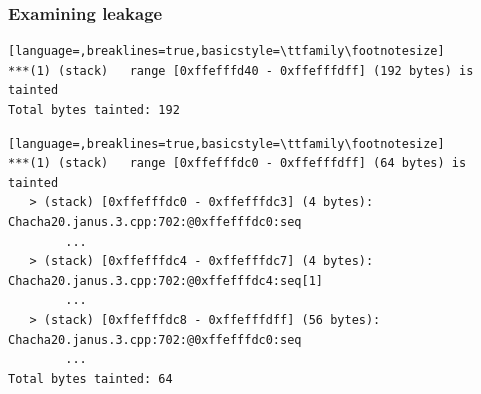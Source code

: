 \documentclass{beamer}
\begin{document}
\addtocounter{page}{1}
\begin{frame}[fragile]
\addtocounter{page}{-1}
\frametitle{Examining leakage}

\begin{lstlisting}[language=,breaklines=true,basicstyle=\ttfamily\footnotesize]
***(1) (stack)	 range [0xffefffd40 - 0xffefffdff] (192 bytes) is tainted
Total bytes tainted: 192
\end{lstlisting}

\begin{lstlisting}[language=,breaklines=true,basicstyle=\ttfamily\footnotesize]
***(1) (stack)	 range [0xffefffdc0 - 0xffefffdff] (64 bytes) is tainted
   > (stack) [0xffefffdc0 - 0xffefffdc3] (4 bytes): Chacha20.janus.3.cpp:702:@0xffefffdc0:seq
        ...
   > (stack) [0xffefffdc4 - 0xffefffdc7] (4 bytes): Chacha20.janus.3.cpp:702:@0xffefffdc4:seq[1]
        ...
   > (stack) [0xffefffdc8 - 0xffefffdff] (56 bytes): Chacha20.janus.3.cpp:702:@0xffefffdc0:seq
        ...
Total bytes tainted: 64
\end{lstlisting}


\end{frame}
\end{document}
